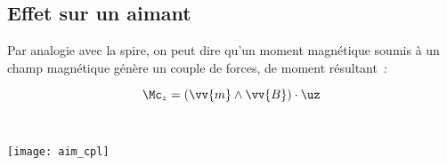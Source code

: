 \documentclass[../main/main.tex]{subfiles}
\begin{document}
\subsection{Effet sur un aimant}
\label{ssec:lplcplaim}

Par analogie avec la spire, on peut dire qu'un moment magnétique soumis à un
champ magnétique génère un couple de forces, de moment résultant~:
\smallbreak
\noindent
\begin{minipage}[t]{.5\linewidth}
  \[
    \Mc_z = \left( \vv{m}\wedge \vv{B} \right)\cdot \uz
  \]
\end{minipage}
\hfill
\begin{minipage}[t]{.5\linewidth}
  ~
  \vspace*{-30pt}
  \begin{center}
    \texttt{[image: aim\_cpl]}
    \label{fig:aim_cpl}
  \end{center}
\end{minipage}
\end{document}
